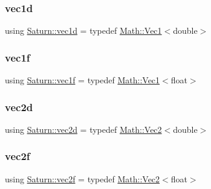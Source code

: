 \mbox{\label{namespace_saturn_a3c9b7582cbea7145f181c1b42b24709f}} 
\subsubsection{\texorpdfstring{vec1d}{vec1d}}
{\footnotesize\ttfamily using \mbox{\hyperlink{namespace_saturn_a3c9b7582cbea7145f181c1b42b24709f}{Saturn\+::vec1d}} = typedef \mbox{\hyperlink{namespace_saturn_1_1_math_acae4f808f0c3284d0b60ee1ac720deaa}{Math\+::\+Vec1}}$<$double$>$}

\mbox{\label{namespace_saturn_a81f7bc25d05c972721ab952eb8a50c21}} 
\subsubsection{\texorpdfstring{vec1f}{vec1f}}
{\footnotesize\ttfamily using \mbox{\hyperlink{namespace_saturn_a81f7bc25d05c972721ab952eb8a50c21}{Saturn\+::vec1f}} = typedef \mbox{\hyperlink{namespace_saturn_1_1_math_acae4f808f0c3284d0b60ee1ac720deaa}{Math\+::\+Vec1}}$<$float$>$}

\mbox{\label{namespace_saturn_a30d3067013f535e483c2a1da724adf22}} 
\subsubsection{\texorpdfstring{vec2d}{vec2d}}
{\footnotesize\ttfamily using \mbox{\hyperlink{namespace_saturn_a30d3067013f535e483c2a1da724adf22}{Saturn\+::vec2d}} = typedef \mbox{\hyperlink{namespace_saturn_1_1_math_a8befc95aeff660bda92b8807c1cc5224}{Math\+::\+Vec2}}$<$double$>$}

\mbox{\label{namespace_saturn_aa55c3449edf84e0efc54c14c7c8e19d8}} 
\subsubsection{\texorpdfstring{vec2f}{vec2f}}
{\footnotesize\ttfamily using \mbox{\hyperlink{namespace_saturn_aa55c3449edf84e0efc54c14c7c8e19d8}{Saturn\+::vec2f}} = typedef \mbox{\hyperlink{namespace_saturn_1_1_math_a8befc95aeff660bda92b8807c1cc5224}{Math\+::\+Vec2}}$<$float$>$}

